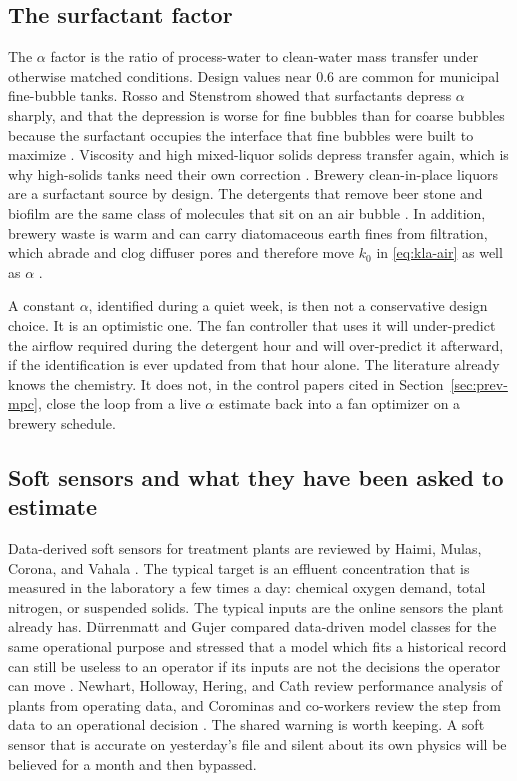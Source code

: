 \subsection{The surfactant factor}

The $\alpha$ factor is the ratio of process-water to clean-water mass transfer under otherwise matched conditions. Design values near $0.6$ are common for municipal fine-bubble tanks. Rosso and Stenstrom showed that surfactants depress $\alpha$ sharply, and that the depression is worse for fine bubbles than for coarse bubbles because the surfactant occupies the interface that fine bubbles were built to maximize \cite{rosso2006alpha}. Viscosity and high mixed-liquor solids depress transfer again, which is why high-solids tanks need their own correction \cite{krampe2003,mueller2002aeration}. Brewery clean-in-place liquors are a surfactant source by design. The detergents that remove beer stone and biofilm are the same class of molecules that sit on an air bubble \cite{goode2013fouling,pettigrew2015cip,simate2011}. In addition, brewery waste is warm and can carry diatomaceous earth fines from filtration, which abrade and clog diffuser pores and therefore move $k_{0}$ in \eqref{eq:kla-air} as well as $\alpha$ \cite{fillaudeau2006}.

A constant $\alpha$, identified during a quiet week, is then not a conservative design choice. It is an optimistic one. The fan controller that uses it will under-predict the airflow required during the detergent hour and will over-predict it afterward, if the identification is ever updated from that hour alone. The literature already knows the chemistry. It does not, in the control papers cited in Section~\ref{sec:prev-mpc}, close the loop from a live $\alpha$ estimate back into a fan optimizer on a brewery schedule.

\subsection{Soft sensors and what they have been asked to estimate}

Data-derived soft sensors for treatment plants are reviewed by Haimi, Mulas, Corona, and Vahala \cite{haimi2013soft}. The typical target is an effluent concentration that is measured in the laboratory a few times a day: chemical oxygen demand, total nitrogen, or suspended solids. The typical inputs are the online sensors the plant already has. D{\"u}rrenmatt and Gujer compared data-driven model classes for the same operational purpose and stressed that a model which fits a historical record can still be useless to an operator if its inputs are not the decisions the operator can move \cite{durrenmatt2012}. Newhart, Holloway, Hering, and Cath review performance analysis of plants from operating data, and Corominas and co-workers review the step from data to an operational decision \cite{newhart2019,corominas2018}. The shared warning is worth keeping. A soft sensor that is accurate on yesterday's file and silent about its own physics will be believed for a month and then bypassed.

